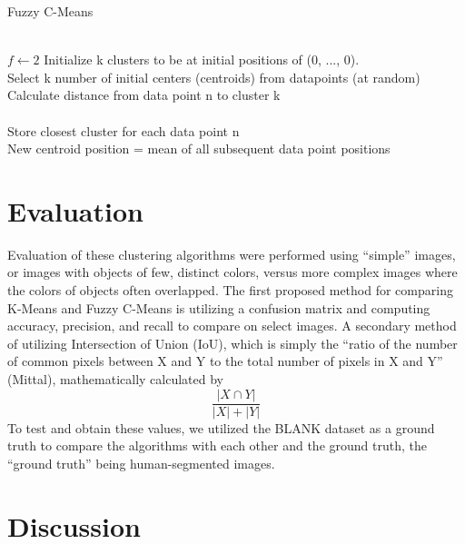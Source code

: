 \documentclass[10pt,twocolumn]{article}
\begin{document}
\begin{algorithm}
  \caption{ Fuzzy C-Means }
  \begin{algorithmic}[1] \\
    \State $f \gets 2$
    Initialize k clusters to be at initial positions of (0, ..., 0).\\
    Select k number of initial centers (centroids) from datapoints (at random)
       \\
        Calculate distance from data point n to cluster k \\
      \EndFor \\
        Store closest cluster for each data point n
     \EndFor \\
        New centroid position = mean of all subsequent data point positions
    \EndWhile
  \end{algorithmic}




\end{algorithm}




\section {Evaluation}

Evaluation of these clustering algorithms were performed using “simple” images, or images with objects of few, distinct colors, versus more complex images where the colors of objects often overlapped. The first proposed method for comparing K-Means and Fuzzy C-Means is utilizing a confusion matrix and computing accuracy, precision, and recall to compare on select images. A secondary method of utilizing Intersection of Union (IoU), which is simply the “ratio of the number of common pixels between X and Y to the total number of pixels in X and Y” (Mittal), mathematically calculated by \[ \frac{|X \cap Y|}{|X| + |Y|} \] To test and obtain these values, we utilized the BLANK dataset as a ground truth to compare the algorithms with each other and the ground truth, the “ground truth” being human-segmented images.

\section {Discussion}





\printbibliography
 
\end{document}
